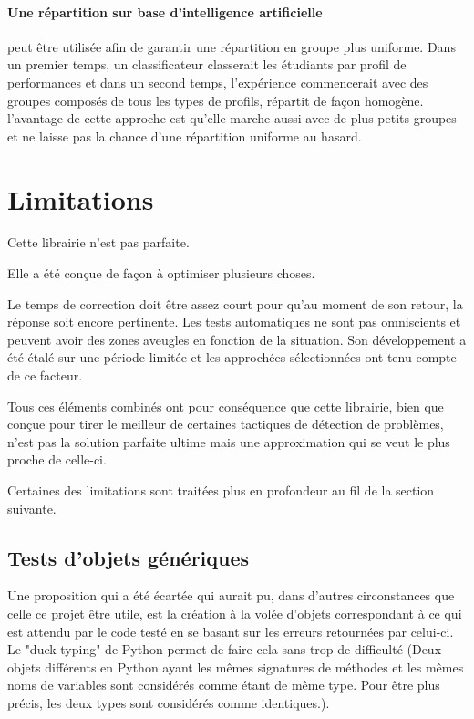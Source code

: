 \documentclass[a4paper]{report}
\begin{document}
\paragraph{Une répartition sur base d'intelligence artificielle} peut être utilisée afin de garantir une répartition en groupe plus uniforme.
Dans un premier temps, un classificateur classerait les étudiants par profil de performances \cite{Hormaux} et dans un second temps, l'expérience commencerait avec des groupes composés de tous les types de profils, répartit de façon homogène.
l'avantage de cette approche est qu'elle marche aussi avec de plus petits groupes et ne laisse pas la chance d'une répartition uniforme au hasard.


\section{Limitations}


\begin{center}
Cette librairie n'est pas parfaite.
\end{center}

Elle a été conçue de façon à optimiser plusieurs choses.

Le temps de correction doit être assez court pour qu’au moment de son retour, la réponse soit encore pertinente.
Les tests automatiques ne sont pas omniscients et peuvent avoir des zones aveugles en fonction de la situation.
Son développement a été étalé sur une période limitée et les approchées sélectionnées ont tenu compte de ce facteur.


Tous ces éléments combinés ont pour conséquence que cette librairie, bien que conçue pour tirer le meilleur de certaines tactiques de détection de problèmes, n'est pas la solution parfaite ultime mais une approximation qui se veut le plus proche de celle-ci.

Certaines des limitations sont traitées plus en profondeur au fil de la section suivante.


\subsection{Tests d'objets génériques}
Une proposition qui  a été écartée qui aurait pu, dans d'autres circonstances que celle ce projet être utile, est la création à la volée d'objets correspondant à ce qui est  attendu par le code testé en se basant sur les erreurs retournées par celui-ci.
Le "duck typing" de Python permet de faire cela sans trop de difficulté (Deux objets différents en Python ayant les mêmes signatures de méthodes et  les mêmes noms de variables sont considérés comme étant de même type. Pour être plus précis, les deux types sont considérés comme identiques.).
\end{document}
